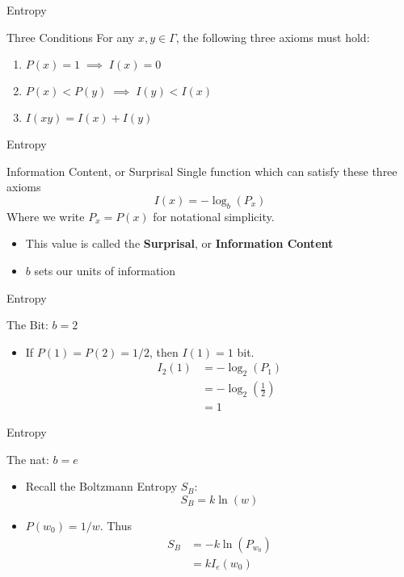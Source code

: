 \begin{frame}{Entropy}

\begin{block}{ Three Conditions}
For any $x,y \in \Gamma$, the following three axioms must hold:
\begin{enumerate}
	\item $P(x) = 1 \; \implies \; I(x)=0$
	\item $P(x) < P(y) \; \implies \; I(y) < I(x)$
	\item $I(xy) = I(x) + I(y)$
\end{enumerate}
\end{block}
\end{frame}

\begin{frame}{Entropy}
\begin{block}{Information Content, or Surprisal}
Single function which can satisfy these three axioms \parencite{shannon_mathematical_nodate}
\begin{equation*}
I(x) = -\log_b(P_x)
\end{equation*}
Where we write $P_x=P(x)$ for notational simplicity.
\begin{itemize}
	\item This value is called the \textbf{Surprisal}, or \textbf{Information Content}
	\item $b$ sets our units of information
\end{itemize}
\end{block}
\end{frame}

\begin{frame}{Entropy}
\begin{block}{The Bit: $b=2$}
\begin{itemize}
\item If $P(1)=P(2) = 1/2$, then $I(1)=1$ bit.
\begin{align*}
	I_2(1) &= -\log_2(P_1)\\
	&= - \log_2\left(\frac{1}{2}\right)\\
	&= 1
\end{align*}
\end{itemize}
\end{block}
\end{frame}

\begin{frame}{Entropy}
\begin{block}{The nat: $b=e$}
\begin{itemize}
	\item Recall the Boltzmann Entropy $S_B$:
	\begin{equation*}
		S_B = k\ln (w)
	\end{equation*}
	\item $P(w_0) = 1/w$. Thus
	\begin{align*}
		S_B &= -k\ln(P_{w_0})\\
		&= kI_e(w_0)
	\end{align*}
\end{itemize}
\end{block}
\end{frame}

